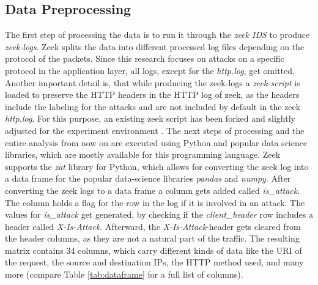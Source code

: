\subsection{Data Preprocessing}
\label{subsec:dataset}
The first step of processing the data is to run it through the \emph{zeek IDS} to produce \emph{zeek-logs}. Zeek splits the data into different processed log files depending on the protocol of the packets. Since this research focuses on attacks on a specific protocol in the application layer, all logs, except for the \emph{http.log}, get omitted. Another important detail is, that while producing the zeek-logs a \emph{zeek-script} is loaded to preserve the HTTP headers in the HTTP log of zeek, as the headers include the labeling for the attacks and are not included by default in the zeek \emph{http.log}. For this purpose, an existing zeek script has been forked and slightly adjusted for the experiment environment \cite{hall2012zeek}. The next steps of processing and the entire analysis from now on are executed using Python and popular data science libraries, which are mostly available for this programming language. Zeek supports the \emph{zat} library for Python, which allows for converting the zeek log into a data frame for the popular data-science libraries \emph{pandas} and \emph{numpy}. After converting the zeek logs to a data frame a column gets added called \emph{is\_attack}. The column holds a flag for the row in the log if it is involved in an attack. The values for \emph{is\_attack} get generated, by checking if the \emph{client\_header} row includes a header called \emph{X-Is-Attack}. Afterward, the \emph{X-Is-Attack}-header gets cleared from the header columns, as they are not a natural part of the traffic. The resulting matrix contains 34 columns, which carry different kinds of data like the URI of the request, the source and destination IPs, the HTTP method used, and many more (compare Table \ref{tab:dataframe} for a full list of columns).


